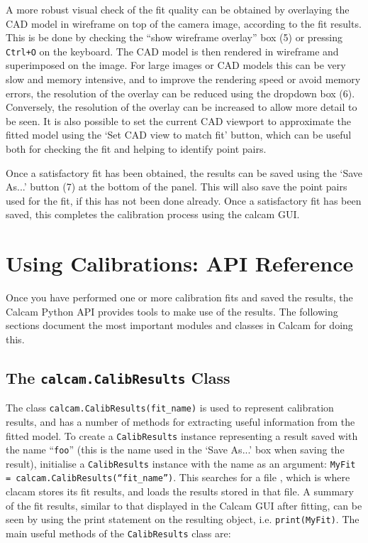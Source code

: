 \documentclass[12pt]{article}
\newcommand{\code}[1]{\texttt{#1}}
\begin{document}
A more robust visual check of the fit quality can be obtained by overlaying the CAD model in wireframe on top of the camera image, according to the fit results. This is be done by checking the ``show wireframe overlay'' box (5) or pressing \code{Ctrl+O} on the keyboard. The CAD model is then rendered in wireframe and superimposed on the image. For large images or CAD models this can be very slow and memory intensive, and to improve the rendering speed or avoid memory errors, the resolution of the overlay can be reduced using the dropdown box (6). Conversely, the resolution of the overlay can be increased to allow more detail to be seen. It is also possible to set the current CAD viewport to approximate the fitted model using the `Set CAD view to match fit' button, which can be useful both for checking the fit and helping to identify point pairs.

Once a satisfactory fit has been obtained, the results can be saved using the `Save As...' button (7) at the bottom of the panel. This will also save the point pairs used for the fit, if this has not been done already. Once a satisfactory fit has been saved, this completes the calibration process using the calcam GUI.

\section{Using Calibrations: API Reference}
Once you have performed one or more calibration fits and saved the results, the Calcam Python API provides tools to make use of the results. The following sections document the most important modules and classes in Calcam for doing this.



\subsection{The \code{calcam.CalibResults} Class}
The class \code{calcam.CalibResults(fit\_name)} is used to represent calibration results, and has a number of methods for extracting useful information from the fitted model. To create a \code{CalibResults} instance representing a result saved with the name ``\code{foo}'' (this is the name used in the `Save As...' box when saving the result), initialise a \code{CalibResults} instance with the name as an argument: \code{MyFit = calcam.CalibResults(``fit\_name'')}. This searches for a file , which is where clacam stores its fit results, and loads the results stored in that file. A summary of the fit results, similar to that displayed in the Calcam GUI after fitting, can be seen by using the print statement on the resulting object, i.e. \code{print(MyFit)}. The main useful methods of the \code{CalibResults} class are:
\end{document}
